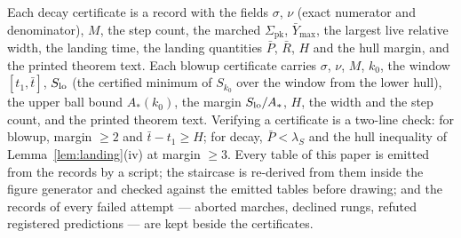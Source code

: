 \documentclass[11pt,a4paper]{article}
\theoremstyle{plain}
\theoremstyle{definition}
\newcommand{\pk}{\mathrm{pk}}
\begin{document}
Each decay certificate is a record with the fields $\sigma$, $\nu$ (exact numerator and denominator), $M$, the step count, the marched $\Sigma_{\pk}$, $\bar Y_{\max}$, the largest live relative width, the landing time, the landing quantities $\bar P$, $\bar R$, $H$ and the hull margin, and the printed theorem text. Each blowup certificate carries $\sigma$, $\nu$, $M$, $k_0$, the window $[t_1,\bar t]$, $S_{\rm lo}$ (the certified minimum of $S_{k_0}$ over the window from the lower hull), the upper ball bound $A_*(k_0)$, the margin $S_{\rm lo}/A_*$, $H$, the width and the step count, and the printed theorem text. Verifying a certificate is a two-line check: for blowup, margin $\ge2$ and $\bar t-t_1\ge H$; for decay, $\bar P<\lambda_S$ and the hull inequality of Lemma~\ref{lem:landing}(iv) at margin $\ge3$. Every table of this paper is emitted from the records by a script; the staircase is re-derived from them inside the figure generator and checked against the emitted tables before drawing; and the records of every failed attempt --- aborted marches, declined rungs, refuted registered predictions --- are kept beside the certificates.
\end{document}
